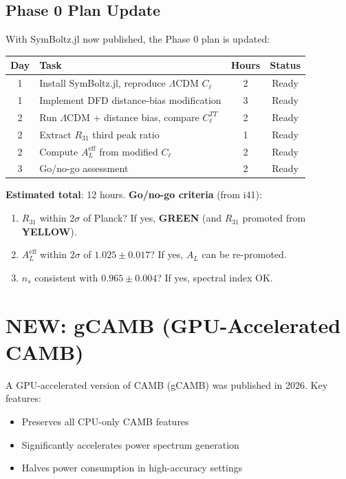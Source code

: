 \documentclass[11pt,a4paper]{article}
\newcommand{\GREEN}{\textcolor{dfdgreen}{\textbf{GREEN}}}
\newcommand{\YELLOW}{\textcolor{dfdyellow}{\textbf{YELLOW}}}
\newcommand{\NEW}{\textcolor{dfdblue}{\textbf{NEW}}}
\begin{document}
\subsection{Phase 0 Plan Update}

With SymBoltz.jl now published, the Phase 0 plan is updated:

\begin{center}
\begin{tabular}{clcc}
\toprule
\textbf{Day} & \textbf{Task} & \textbf{Hours} & \textbf{Status} \\
\midrule
1 & Install SymBoltz.jl, reproduce $\Lambda$CDM $C_\ell$ & 2 & Ready \\
1 & Implement DFD distance-bias modification & 3 & Ready \\
2 & Run $\Lambda$CDM + distance bias, compare $C_\ell^{TT}$ & 2 & Ready \\
2 & Extract $R_{31}$ third peak ratio & 1 & Ready \\
2 & Compute $A_L^{\text{eff}}$ from modified $C_\ell$ & 2 & Ready \\
3 & Go/no-go assessment & 2 & Ready \\
\bottomrule
\end{tabular}
\end{center}

\textbf{Estimated total}: 12 hours. \textbf{Go/no-go criteria} (from i41):
\begin{enumerate}
\item $R_{31}$ within $2\sigma$ of Planck? If yes, \GREEN{} (and $R_{31}$ promoted from \YELLOW).
\item $A_L^{\text{eff}}$ within $2\sigma$ of $1.025 \pm 0.017$? If yes, $A_L$ can be re-promoted.
\item $n_s$ consistent with $0.965 \pm 0.004$? If yes, spectral index OK.
\end{enumerate}

\section{\NEW: gCAMB (GPU-Accelerated CAMB)}

A GPU-accelerated version of CAMB (gCAMB) was published in 2026. Key features:
\begin{itemize}
\item Preserves all CPU-only CAMB features
\item Significantly accelerates power spectrum generation
\item Halves power consumption in high-accuracy settings
\end{itemize}
\end{document}
